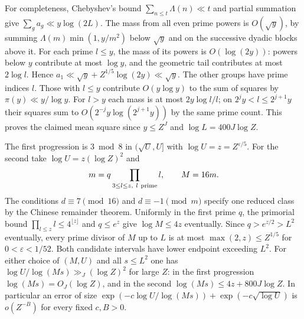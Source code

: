 \documentclass[11pt]{amsart}
\theoremstyle{definition}
\theoremstyle{remark}
\begin{document}
For completeness, Chebyshev's bound $\sum_{n\le t}\Lambda(n)\ll t$
and partial summation give $\sum_g a_g\ll y\log(2L)$.
The mass from all even prime powers is $O(\sqrt y)$, by summing
$\Lambda(m)\min(1,y/m^2)$ below $\sqrt y$ and on the successive
dyadic blocks above it. For each prime $l\le y$, the mass of its
powers is $O(\log(2y))$: powers below $y$ contribute at most
$\log y$, and the geometric tail contributes at most $2\log l$.
Hence $a_1\ll\sqrt y+Z^{1/5}\log(2y)\ll\sqrt y$.
The other groups have prime indices $l$. Those with $l\le y$
contribute $O(y\log y)$ to the sum of squares by
$\pi(y)\ll y/\log y$. For $l>y$ each mass is at most
$2y\log l/l$; on $2^j y<l\le2^{j+1}y$ their squares sum to
$O(2^{-j}y\log(2^{j+1}y))$ by the same prime count. This proves
the claimed mean square since $y\le Z^J$ and $\log L=400J\log Z$.

The first progression is $3\bmod 8$ in $(\sqrt U,U]$ with
$\log U=z=Z^{\varepsilon/5}$. For the second take
$\log U=z(\log Z)^2$ and
\[
 m=q\prod_{3\le l\le z,\ l\ {\rm prime}}l,\qquad M=16m .
\]
The conditions $d\equiv7\pmod {16}$ and $d\equiv-1\pmod m$
specify one reduced class by the Chinese remainder theorem. Uniformly
in the first prime $q$, the primorial bound
$\prod_{l\le z}l\le4^{\lfloor z\rfloor}$ and $q\le e^z$
give $\log M\le4z$ eventually. Since $q>e^{z/2}>L^2$
eventually, every prime divisor of $M$ up to $L$ is at most
$\max(2,z)\le Z^{1/5}$ for $0<\varepsilon<1/52$. Both candidate
intervals have lower endpoint exceeding $L^2$. For either choice
of $(M,U)$ and all $s\le L^2$ one has
$\log U/\log(Ms)\gg_J(\log Z)^2$ for large $Z$: in the
first progression $\log(Ms)=O_J(\log Z)$, and in the second
$\log(Ms)\le4z+800J\log Z$. In particular an error of size
$\exp(-c\log U/\log(Ms))+\exp(-c\sqrt{\log U})$ is
$o(Z^{-B})$ for every fixed $c,B>0$.
\end{document}
